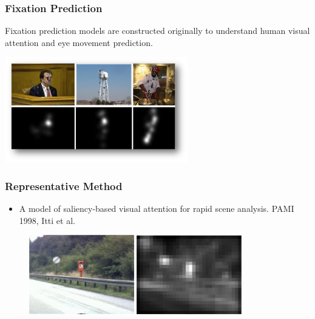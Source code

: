 \documentclass[notheorems,serif,table,compress]{beamer}  %
\begin{document}

\begin{frame}
\frametitle{Fixation Prediction}
Fixation prediction models are constructed originally to understand human visual attention and eye movement prediction.

\centering\includegraphics[width=8cm]{fixationPrediction.png}
\end{frame}

\begin{frame}
\frametitle{Representative Method}
\begin{itemize}
\item A model of saliency-based visual attention for rapid scene analysis. PAMI 1998, Itti et al.
\end{itemize}
\begin{figure}[!ht]
  \begin{minipage}[t]{0.45\textwidth}
  \includegraphics[width=1.8in]{sign}
  \end{minipage}
  \begin{minipage}[t]{0.45\textwidth}
  \includegraphics[width=1.8in]{signSaliency}
  \end{minipage}
  \end{figure} 
\end{frame}
\end{document}

